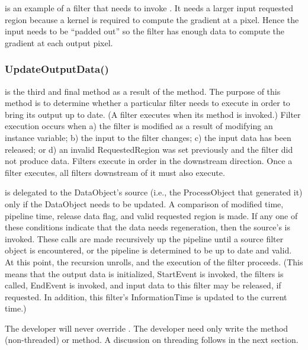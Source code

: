  is an example of a filter that needs to
invoke . It needs a larger input requested
region because a kernel is required to compute the gradient at a pixel. Hence
the input needs to be ``padded out'' so the filter has enough data to compute
the gradient at each output pixel.

\subsubsection{UpdateOutputData()}
\label{sec:UpdateOutputData}

 is the third and final method as a result of the
 method. The purpose of this method is to determine whether a
particular filter needs to execute in order to bring its output up to date. (A
filter executes when its  method is invoked.) Filter
execution occurs when a) the filter is modified as a result of modifying an
instance variable; b) the input to the filter changes; c) the input data has
been released; or d) an invalid RequestedRegion was set previously and the
filter did not produce data. Filters execute in order in the downstream
direction.  Once a filter executes, all filters downstream of it must also
execute.

 is delegated to the DataObject's source
(i.e., the ProcessObject that generated it) only if the DataObject needs to be
updated. A comparison of modified time, pipeline time, release data flag, and
valid requested region is made. If any one of these conditions indicate that
the data needs regeneration, then the source's
 is invoked. These calls are made
recursively up the pipeline until a source filter object is encountered, or the
pipeline is determined to be up to date and valid. At this point, the recursion
unrolls, and the execution of the filter proceeds. (This means that the output
data is initialized, StartEvent is invoked, the filters 
is called, EndEvent is invoked, and input data to this filter may be released,
if requested. In addition, this filter's InformationTime is updated to the
current time.)

The developer will never override . The developer need
only write the  method (non-threaded) or
 method. A discussion on threading follows in the
next section.


